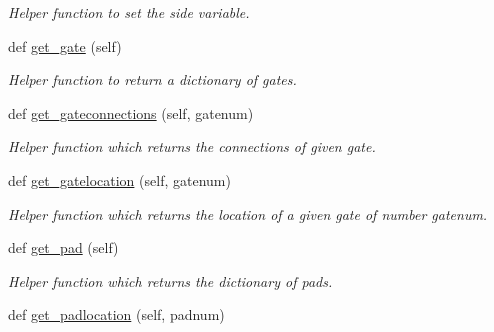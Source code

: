 \begin{DoxyCompactItemize}
\begin{DoxyCompactList}\small\item\em Helper function to set the side variable. \end{DoxyCompactList}\item 
def \hyperlink{classgqp__placer_1_1mothercore_a9d4ec1ac49ac17f5d4ce7c4c743cbc96}{get\+\_\+gate} (self)\hypertarget{classgqp__placer_1_1mothercore_a9d4ec1ac49ac17f5d4ce7c4c743cbc96}{}\label{classgqp__placer_1_1mothercore_a9d4ec1ac49ac17f5d4ce7c4c743cbc96}

\begin{DoxyCompactList}\small\item\em Helper function to return a dictionary of gates. \end{DoxyCompactList}\item 
def \hyperlink{classgqp__placer_1_1mothercore_a396e123fe8d6cbad16f828dd21c56132}{get\+\_\+gateconnections} (self, gatenum)\hypertarget{classgqp__placer_1_1mothercore_a396e123fe8d6cbad16f828dd21c56132}{}\label{classgqp__placer_1_1mothercore_a396e123fe8d6cbad16f828dd21c56132}

\begin{DoxyCompactList}\small\item\em Helper function which returns the connections of given gate. \end{DoxyCompactList}\item 
def \hyperlink{classgqp__placer_1_1mothercore_a5fc0b24a700a395afd65bb703f887e41}{get\+\_\+gatelocation} (self, gatenum)\hypertarget{classgqp__placer_1_1mothercore_a5fc0b24a700a395afd65bb703f887e41}{}\label{classgqp__placer_1_1mothercore_a5fc0b24a700a395afd65bb703f887e41}

\begin{DoxyCompactList}\small\item\em Helper function which returns the location of a given gate of number \textquotesingle{}gatenum\textquotesingle{}. \end{DoxyCompactList}\item 
def \hyperlink{classgqp__placer_1_1mothercore_a4729070c9a33e5e87a0c2cae03775e67}{get\+\_\+pad} (self)\hypertarget{classgqp__placer_1_1mothercore_a4729070c9a33e5e87a0c2cae03775e67}{}\label{classgqp__placer_1_1mothercore_a4729070c9a33e5e87a0c2cae03775e67}

\begin{DoxyCompactList}\small\item\em Helper function which returns the dictionary of pads. \end{DoxyCompactList}\item 
def \hyperlink{classgqp__placer_1_1mothercore_ad3d0a4a7e7c542864c4ba2adcfd7280a}{get\+\_\+padlocation} (self, padnum)\hypertarget{classgqp__placer_1_1mothercore_ad3d0a4a7e7c542864c4ba2adcfd7280a}{}\label{classgqp__placer_1_1mothercore_ad3d0a4a7e7c542864c4ba2adcfd7280a}


\end{DoxyCompactItemize}
